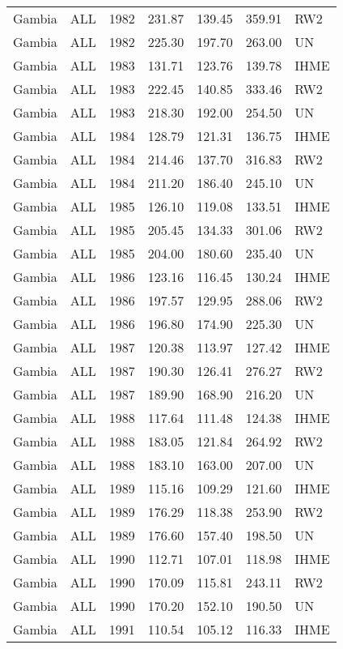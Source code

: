 \begin{longtable}{lllrrrl}
  Gambia & ALL & 1982 & 231.87 & 139.45 & 359.91 & RW2 \\ 
  Gambia & ALL & 1982 & 225.30 & 197.70 & 263.00 & UN \\ 
  Gambia & ALL & 1983 & 131.71 & 123.76 & 139.78 & IHME \\ 
  Gambia & ALL & 1983 & 222.45 & 140.85 & 333.46 & RW2 \\ 
  Gambia & ALL & 1983 & 218.30 & 192.00 & 254.50 & UN \\ 
  Gambia & ALL & 1984 & 128.79 & 121.31 & 136.75 & IHME \\ 
  Gambia & ALL & 1984 & 214.46 & 137.70 & 316.83 & RW2 \\ 
  Gambia & ALL & 1984 & 211.20 & 186.40 & 245.10 & UN \\ 
  Gambia & ALL & 1985 & 126.10 & 119.08 & 133.51 & IHME \\ 
  Gambia & ALL & 1985 & 205.45 & 134.33 & 301.06 & RW2 \\ 
  Gambia & ALL & 1985 & 204.00 & 180.60 & 235.40 & UN \\ 
  Gambia & ALL & 1986 & 123.16 & 116.45 & 130.24 & IHME \\ 
  Gambia & ALL & 1986 & 197.57 & 129.95 & 288.06 & RW2 \\ 
  Gambia & ALL & 1986 & 196.80 & 174.90 & 225.30 & UN \\ 
  Gambia & ALL & 1987 & 120.38 & 113.97 & 127.42 & IHME \\ 
  Gambia & ALL & 1987 & 190.30 & 126.41 & 276.27 & RW2 \\ 
  Gambia & ALL & 1987 & 189.90 & 168.90 & 216.20 & UN \\ 
  Gambia & ALL & 1988 & 117.64 & 111.48 & 124.38 & IHME \\ 
  Gambia & ALL & 1988 & 183.05 & 121.84 & 264.92 & RW2 \\ 
  Gambia & ALL & 1988 & 183.10 & 163.00 & 207.00 & UN \\ 
  Gambia & ALL & 1989 & 115.16 & 109.29 & 121.60 & IHME \\ 
  Gambia & ALL & 1989 & 176.29 & 118.38 & 253.90 & RW2 \\ 
  Gambia & ALL & 1989 & 176.60 & 157.40 & 198.50 & UN \\ 
  Gambia & ALL & 1990 & 112.71 & 107.01 & 118.98 & IHME \\ 
  Gambia & ALL & 1990 & 170.09 & 115.81 & 243.11 & RW2 \\ 
  Gambia & ALL & 1990 & 170.20 & 152.10 & 190.50 & UN \\ 
  Gambia & ALL & 1991 & 110.54 & 105.12 & 116.33 & IHME \\ 

\end{longtable}
